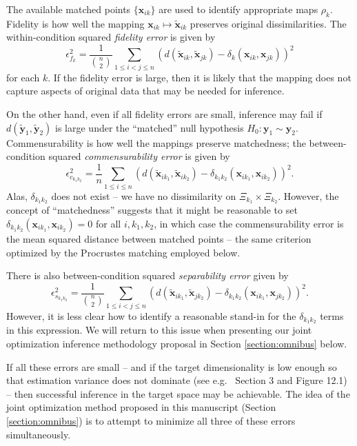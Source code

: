 \documentclass[12pt,xcolor]{article}
\newcommand{\1}{\ensuremath{\mbox{{\bf 1}}}}
\begin{document}
The available matched points $\{\bm{x}_{ik}\}$ are used to identify appropriate maps $\rho_k$.
Fidelity is how well the mapping $\bm{x}_{ik} \mapsto \widetilde{\bm{x}}_{ik}$ preserves original dissimilarities.
The within-condition squared {\em fidelity error} is given by
    $$\epsilon^2_{f_{k}} = \frac{1}{{{n}\choose{2}}} \sum_{1 \leq i < j \leq n} (d(\widetilde{\bm{x}}_{ik},\widetilde{\bm{x}}_{jk})-\delta_k(\bm{x}_{ik},\bm{x}_{jk}))^2$$
for each $k$.
If the fidelity error is large, then it is likely that the mapping does not capture aspects of
original data that may be needed for inference.

On the other hand, even if all fidelity errors are small,
inference may fail if
$d(\widetilde{\bm{y}}_1,\widetilde{\bm{y}}_2)$ is large
under the ``matched'' null hypothesis
$H_0: \bm{y}_{1} \sim \bm{y}_{2}$.
Commensurability is how well the mappings preserve matchedness;
the between-condition squared {\em commensurability error} is given by
    $$\epsilon^2_{c_{k_1k_2}} = \frac{1}{n} \sum_{1 \leq i \leq n} (d(\widetilde{\bm{x}}_{ik_1},\widetilde{\bm{x}}_{ik_2})- \delta_{k_1k_2}(\bm{x}_{ik_1},\bm{x}_{ik_2}))^2.$$
Alas, $\delta_{k_1k_2}$ does not exist -- we have no dissimilarity on $\Xi_{k_1} \times \Xi_{k_2}$.
However, the concept of ``matchedness'' suggests that it might be reasonable to set $\delta_{k_1k_2}(\bm{x}_{ik_1},\bm{x}_{ik_2}) = 0$ for all $i,k_1,k_2$,
in which case the commensurability error is the mean squared distance between
matched points -- the same criterion optimized by the Procrustes matching employed below.

There is also between-condition squared {\em separability error} given by
    $$\epsilon^2_{s_{k_1k_2}} = \frac{1}{{{n}\choose{2}}} \sum_{1 \leq i < j \leq n} (d(\widetilde{\bm{x}}_{ik_1},\widetilde{\bm{x}}_{jk_2})- \delta_{k_1k_2}(\bm{x}_{ik_1},\bm{x}_{jk_2}))^2.$$
However, it is less clear how to identify a reasonable stand-in for the $\delta_{k_1k_2}$ terms in this expression.
We will return to this issue when presenting our joint optimization inference methodology proposal in Section \ref{section:omnibus} below.

If all these errors are small -- and if the target dimensionality is low enough
so that estimation variance does not dominate (see e.g.\ \cite{jdm00} Section 3 and \cite{DGL} Figure 12.1) --
then successful inference in the target space may be achievable.
The idea of the joint optimization method proposed in this manuscript (Section \ref{section:omnibus})
is to attempt to minimize all three of these errors simultaneously.
\end{document}
